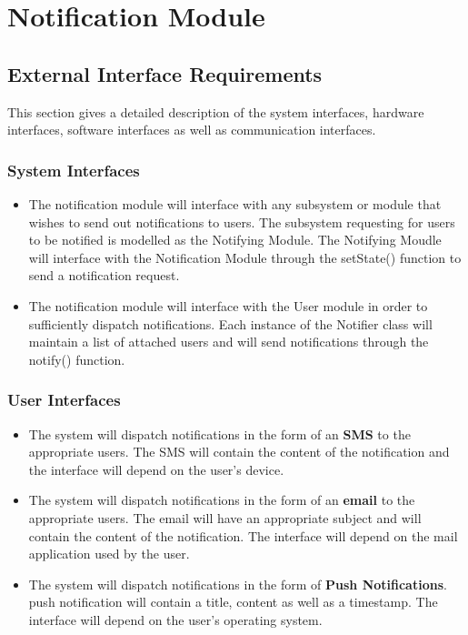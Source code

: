 \section{Notification Module}
\subsection{External Interface Requirements}
This section gives a detailed description of the system interfaces, hardware interfaces, software interfaces as well as communication interfaces.
\subsubsection{System Interfaces}
\begin{itemize}
	\item The notification module will interface with any subsystem or module that wishes to send out notifications to users. The subsystem requesting for users to be notified is modelled as the Notifying Module. The Notifying Moudle will interface with the Notification Module through the setState() function to send a notification request. 
	
	\item The notification module will interface with the User module in order to sufficiently dispatch notifications. Each instance of the Notifier class will maintain a list of attached users and will send notifications through the notify() function.
\end{itemize}

\subsubsection{User Interfaces}
\begin{itemize}
	\item The system will dispatch notifications in the form of an \textbf{SMS} to the appropriate users. The SMS will contain the content of the notification and the interface will depend on the user's device.
	
	\item The system will dispatch notifications in the form of an \textbf{email} to the appropriate users. The email will have an appropriate subject and will contain the content of the notification. The interface will depend on the mail application used by the user.
	
	\item The system will dispatch notifications in the form of \textbf{Push Notifications}.  push notification will contain a title, content as well as a timestamp. The interface will depend on the user's operating system. 
\end{itemize}

